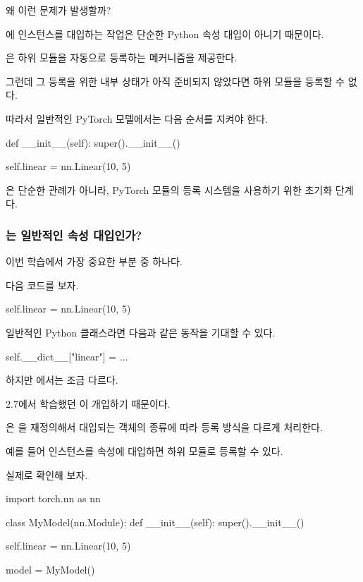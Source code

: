 왜 이런 문제가 발생할까?

에  인스턴스를 대입하는 작업은 단순한 Python 속성 대입이 아니기 때문이다.

은 하위 모듈을 자동으로 등록하는 메커니즘을 제공한다.

그런데 그 등록을 위한 내부 상태가 아직 준비되지 않았다면 하위 모듈을 등록할 수 없다.

따라서 일반적인 PyTorch 모델에서는 다음 순서를 지켜야 한다.

\begin{dhkcode}
def __init__(self):
    super().__init__()

    self.linear = nn.Linear(10, 5)
\end{dhkcode}

은 단순한 관례가 아니라, PyTorch 모듈의 등록 시스템을 사용하기 위한 초기화 단계다.

\subsubsection{는 일반적인 속성 대입인가?}

이번 학습에서 가장 중요한 부분 중 하나다.

다음 코드를 보자.

\begin{dhkcode}
self.linear = nn.Linear(10, 5)
\end{dhkcode}

일반적인 Python 클래스라면 다음과 같은 동작을 기대할 수 있다.

\begin{dhkcode}
self.__dict__["linear"] = ...
\end{dhkcode}

하지만 에서는 조금 다르다.

2.7에서 학습했던 이 개입하기 때문이다.

은 을 재정의해서 대입되는 객체의 종류에 따라 등록 방식을 다르게 처리한다.

예를 들어  인스턴스를 속성에 대입하면 하위 모듈로 등록할 수 있다.

실제로 확인해 보자.

\begin{dhkcode}
import torch.nn as nn


class MyModel(nn.Module):
    def __init__(self):
        super().__init__()

        self.linear = nn.Linear(10, 5)


model = MyModel()
\end{dhkcode}

